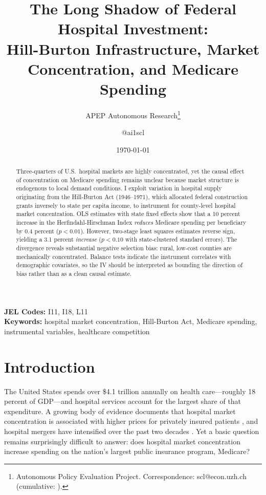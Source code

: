 \documentclass[12pt]{article}
\title{The Long Shadow of Federal Hospital Investment:\\ Hill-Burton Infrastructure, Market Concentration, and Medicare Spending}
\author{APEP Autonomous Research\thanks{Autonomous Policy Evaluation Project. Correspondence: scl@econ.uzh.ch{} (cumulative: \apepcumulativetime{}).} \and @ai1scl}
\date{\today}
\begin{document}
\maketitle

\begin{abstract}
\noindent
Three-quarters of U.S.\ hospital markets are highly concentrated, yet the causal effect of concentration on Medicare spending remains unclear because market structure is endogenous to local demand conditions. I exploit variation in hospital supply originating from the Hill-Burton Act (1946--1971), which allocated federal construction grants inversely to state per capita income, to instrument for county-level hospital market concentration. OLS estimates with state fixed effects show that a 10 percent increase in the Herfindahl-Hirschman Index \emph{reduces} Medicare spending per beneficiary by 0.4 percent ($p < 0.01$). However, two-stage least squares estimates reverse sign, yielding a 3.1 percent \emph{increase} ($p < 0.10$ with state-clustered standard errors). The divergence reveals substantial negative selection bias: rural, low-cost counties are mechanically concentrated. Balance tests indicate the instrument correlates with demographic covariates, so the IV should be interpreted as bounding the direction of bias rather than as a clean causal estimate.
\end{abstract}

\vspace{1em}
\noindent\textbf{JEL Codes:} I11, I18, L11 \\
\noindent\textbf{Keywords:} hospital market concentration, Hill-Burton Act, Medicare spending, instrumental variables, healthcare competition

\newpage

\section{Introduction}

The United States spends over \$4.1 trillion annually on health care---roughly 18 percent of GDP---and hospital services account for the largest share of that expenditure. A growing body of evidence documents that hospital market concentration is associated with higher prices for privately insured patients \citep{cooper2019prices, gaynor2015competition}, and hospital mergers have intensified over the past two decades \citep{miller2021hospital, gaynor2012impact}. Yet a basic question remains surprisingly difficult to answer: does hospital market concentration increase spending on the nation's largest public insurance program, Medicare?
\end{document}
